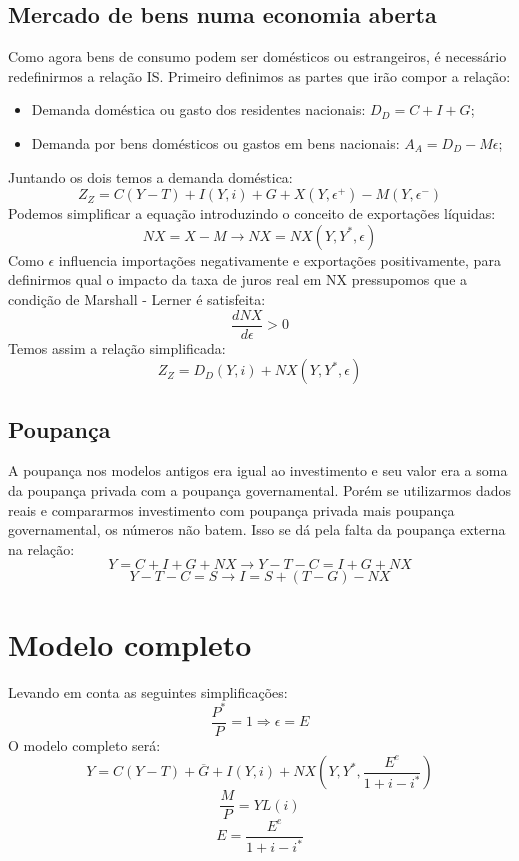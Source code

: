 \documentclass[12pt,a4paper,oneside,brazil]{abntex2}
\begin{document}
\subsection{Mercado de bens numa economia aberta}
Como agora bens de consumo podem ser domésticos ou estrangeiros, é necessário redefinirmos a relação IS. Primeiro definimos as partes que irão compor a relação:
\begin{itemize}
\item Demanda doméstica ou gasto dos residentes nacionais: $D_D = C + I + G$;
\item Demanda por bens domésticos ou gastos em bens nacionais: $A_A = D_D - M \epsilon$;
\end{itemize}
Juntando os dois temos a demanda doméstica:
\[ Z_Z = C (Y - T) + I ( Y, i) + G + X (Y, \epsilon^+) - M (Y, \epsilon^-) \]
Podemos simplificar a equação introduzindo o conceito de exportações líquidas:
\[ NX = X - M \rightarrow NX = NX(Y, Y^{*}, \epsilon) \]
Como $\epsilon$ influencia importações negativamente e exportações positivamente, para definirmos qual o impacto da taxa de juros real em NX pressupomos que a condição de Marshall - Lerner é satisfeita:
\[ \frac{d NX}{d \epsilon} > 0\]
Temos assim a relação simplificada:
\[ Z_Z = D_D ( Y, i ) + NX (Y, Y^{*}, \epsilon) \]

\subsection{Poupança}
A poupança nos modelos antigos era igual ao investimento e seu valor era a soma da poupança privada com a poupança governamental. Porém se utilizarmos dados reais e compararmos investimento com poupança privada mais poupança governamental, os números não batem. Isso se dá pela falta da poupança externa na relação:
\[ Y  = C + I + G + NX \rightarrow Y - T - C  = I + G + NX\]
\[ Y - T -C = S \rightarrow I = S + (T -G) - NX \]

\section{Modelo completo}
Levando em conta as seguintes simplificações:
\[ \frac{P^{*}}{P} = 1 \Rightarrow  \epsilon = E\]
O modelo completo será:
\begin{equation}\label{IS}
Y = C (Y - T) + \overline{G} + I  (Y, i ) + NX ( Y, Y^{*}, \frac{E^e}{1 + i - i^{*}})
\end{equation}
\begin{equation}\label{LM}
\frac{M}{P} = Y L (i)
\end{equation}
\begin{equation}\label{E}
E = \frac{E^e}{1 + i - i^{*}}
\end{equation}
\end{document}
